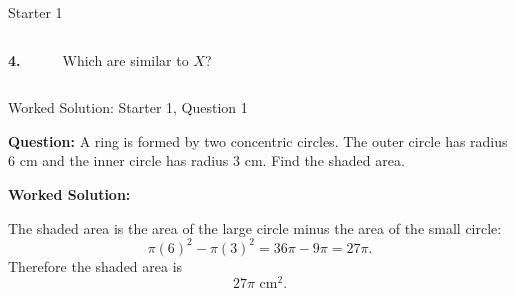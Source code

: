 \documentclass{beamer}
\newcommand{\ashow}[1]{\uncover<2->{\textcolor{red}{\small #1}}}
\newcommand{\cuboid}[4]{
\begin{scope}[shift={(#1,#2)}]
  \draw (0,0) rectangle (2,1);
  \draw (0.6,0.6) rectangle (2.6,1.6);
  \draw (0,0) -- (0.6,0.6);
  \draw (2,0) -- (2.6,0.6);
  \draw (2,1) -- (2.6,1.6);
  \draw (0,1) -- (0.6,1.6);

  \node at (1,-0.4) {\tiny \bf{#3}};
  \node at (1,-1.2) {\tiny #4};

  \StrBefore{#4}{×}[\widthstr]                %
  \StrBehind{#4}{×}[\temp]                    %
  \StrBefore{\temp}{×}[\heightstr]             %
  \StrBehind{\temp}{×}[\depthstr]               %

  \draw (0,0) -- (0,-0.6);                     %
  \draw (2,0) -- (2,-0.6);                      %
  \draw (0,-0.8) -- (2,-0.8);                   %
  \draw (0,-0.75) -- (0,-0.85);
  \draw (2,-0.75) -- (2,-0.85);
  \node at (1,-0.8) [fill=white, inner sep=1pt] {\tiny \widthstr};

  \draw (0,0) -- (-0.6,0);                      %
  \draw (0,1) -- (-0.6,1);                       %
  \draw (-0.8,0) -- (-0.8,1);                    %
  \draw (-0.75,0) -- (-0.85,0);
  \draw (-0.75,1) -- (-0.85,1);
  \node at (-0.8,0.5) [fill=white, inner sep=1pt] {\tiny \heightstr};

    \coordinate (B) at (2,0);
    \coordinate (F) at (2.6,0.6);
    \coordinate (dir) at ($(F)-(B)$);              %
    \coordinate (offset) at (0.3,-0.3);
    \def\shorten{0.1}
    \coordinate (start) at ($(B)+(offset)+\shorten*(dir)$);
    \coordinate (end)   at ($(F)+(offset)-\shorten*(dir)$);
    \draw (start) -- (end);
    \coordinate (tickDir) at ($(0,0)!0.1!(dir)$);        %
\coordinate (start) at ($(B)+(offset)+(0,0)!\shorten!(dir)$);
\coordinate (end)   at ($(F)+(offset)-(0,0)!\shorten!(dir)$);;
    \node at ($(start)!0.5!(end)$) [fill=white, inner sep=1pt] {\tiny \depthstr};
\end{scope}
}
\begin{document}
\begin{frame}{Starter 1}
\begin{columns}[T]

\ashow{\(\frac{1}{6}\times 27\pi = 4.5\pi\text{ cm}^2\)}

\vspace{0.2cm}

\textbf{4.}
\begin{center}
\end{center}


Which are similar to $X$?

\ashow{Similar shapes: B, C, D}

\end{columns}

\end{frame}


\begin{frame}{Worked Solution: Starter 1, Question 1}
\hypertarget{work-st1}{}

\textbf{Question:} A ring is formed by two concentric circles. The outer circle has radius \(6\) cm and the inner circle has radius \(3\) cm. Find the shaded area.

\textbf{Worked Solution:}

The shaded area is the area of the large circle minus the area of the small circle:
\[
\pi(6)^2-\pi(3)^2
=36\pi-9\pi
=27\pi.
\]
Therefore the shaded area is
\[
\boxed{27\pi\text{ cm}^2}.
\]

\end{frame}
\end{document}
